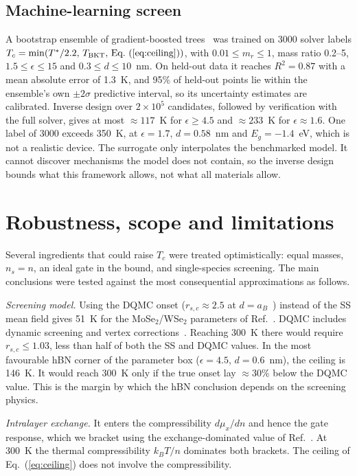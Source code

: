 \documentclass[aip,jap,reprint,amsmath,amssymb]{revtex4-2}
\begin{document}
\subsection{Machine-learning screen}
A bootstrap ensemble of gradient-boosted trees~\cite{Pedregosa2011} was trained on 3000 solver labels
$T_c=\min(T^*/2.2,\,T_{\rm BKT},\,\text{Eq.~(\ref{eq:ceiling})})$, with $0.01\le m_r\le1$, mass ratio 0.2--5,
$1.5\le\epsilon\le15$ and $0.3\le d\le10$~nm. On held-out data it reaches $R^2=0.87$ with a mean absolute error of 1.3~K, and 95\% of held-out points lie within the ensemble's own $\pm2\sigma$ predictive interval, so its uncertainty estimates are calibrated. Inverse design over $2\times10^5$ candidates, followed by verification with the full solver, gives at most
$\approx117$~K for $\epsilon\ge4.5$ and $\approx233$~K for $\epsilon\approx1.6$. One label of 3000 exceeds 350~K, at
$\epsilon=1.7$, $d=0.58$~nm and $E_g=-1.4$~eV, which is not a realistic device. The surrogate only interpolates the benchmarked model. It cannot discover mechanisms the model does not contain, so the inverse design bounds what this framework allows, not what all materials allow.

\section{Robustness, scope and limitations}
Several ingredients that could raise $T_c$ were treated optimistically: equal masses, $n_s=n$, an ideal gate in the bound, and
single-species screening. The main conclusions were tested against the most consequential approximations as follows.

\textit{Screening model.} Using the DQMC onset ($r_{s,c}\approx2.5$ at $d=a_B$~\cite{Neilson2014}) instead of the SS mean field gives
51~K for the MoSe$_2$/WSe$_2$ parameters of Ref.~. DQMC includes dynamic screening and vertex
corrections~\cite{Neilson2014}. Reaching 300~K there would require $r_{s,c}\le1.03$, less than half of both the SS and DQMC values. In the
most favourable hBN corner of the parameter box ($\epsilon=4.5$, $d=0.6$~nm), the ceiling is 146~K. It would reach 300~K only if the
true onset lay $\approx$30\% below the DQMC value. This is the margin by which the hBN conclusion depends on the screening physics.

\textit{Intralayer exchange.} It enters the compressibility $d\mu_x/dn$ and hence the gate response, which we bracket using the
exchange-dominated value of Ref.~. At 300~K the thermal compressibility $k_BT/n$ dominates both brackets. The
ceiling of Eq.~(\ref{eq:ceiling}) does not involve the compressibility.
\end{document}
